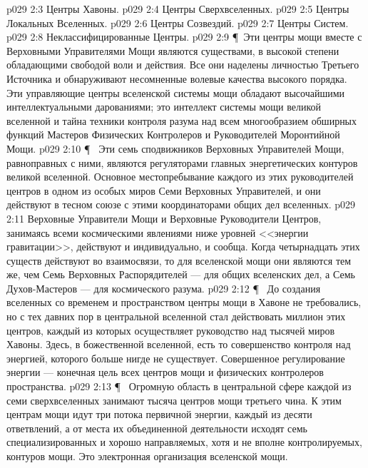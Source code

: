 \vs p029 2:3 \bibnobreakspace Центры Хавоны.
\vs p029 2:4 \bibnobreakspace Центры Сверхвселенных.
\vs p029 2:5 \bibnobreakspace Центры Локальных Вселенных.
\vs p029 2:6 \bibnobreakspace Центры Созвездий.
\vs p029 2:7 \bibnobreakspace Центры Систем.
\vs p029 2:8 \bibnobreakspace Неклассифицированные Центры.
\vs p029 2:9 \P\ Эти центры мощи вместе с Верховными Управителями Мощи являются существами, в высокой степени обладающими свободой воли и действия. Все они наделены личностью Третьего Источника и обнаруживают несомненные волевые качества высокого порядка. Эти управляющие центры вселенской системы мощи обладают высочайшими интеллектуальными дарованиями; это интеллект системы мощи великой вселенной и тайна техники контроля разума над всем многообразием обширных функций Мастеров Физических Контролеров и Руководителей Моронтийной Мощи.
\vs p029 2:10 \P\ \bibnobreakspace {} Эти семь сподвижников Верховных Управителей Мощи, равноправных с ними, являются регуляторами главных энергетических контуров великой вселенной. Основное местопребывание каждого из этих руководителей центров в одном из особых миров Семи Верховных Управителей, и они действуют в тесном союзе с этими координаторами общих дел вселенных.
\vs p029 2:11 Верховные Управители Мощи и Верховные Руководители Центров, занимаясь всеми космическими явлениями ниже уровней <<энергии гравитации>>, действуют и индивидуально, и сообща. Когда четырнадцать этих существ действуют во взаимосвязи, то для вселенской мощи они являются тем же, чем Семь Верховных Распорядителей --- для общих вселенских дел, а Семь Духов\hyp{}Мастеров --- для космического разума.
\vs p029 2:12 \P\ \bibnobreakspace {} До создания вселенных со временем и пространством центры мощи в Хавоне не требовались, но с тех давних пор в центральной вселенной стал действовать миллион этих центров, каждый из которых осуществляет руководство над тысячей миров Хавоны. Здесь, в божественной вселенной, есть то совершенство контроля над энергией, которого больше нигде не существует. Совершенное регулирование энергии --- конечная цель всех центров мощи и физических контролеров пространства.
\vs p029 2:13 \P\ \bibnobreakspace {} Огромную область в центральной сфере каждой из семи сверхвселенных занимают тысяча центров мощи третьего чина. К этим центрам мощи идут три потока первичной энергии, каждый из десяти ответвлений, а от места их объединенной деятельности исходят семь специализированных и хорошо направляемых, хотя и не вполне контролируемых, контуров мощи. Это электронная организация вселенской мощи.
